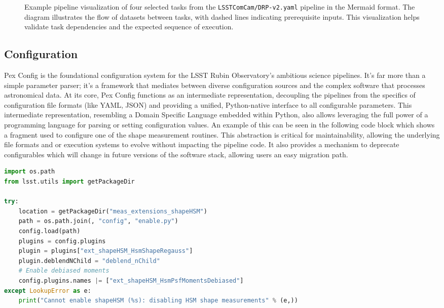 \begin{figure*}
    \centering
    \caption{
        Example pipeline visualization of four selected tasks from the \texttt{LSSTComCam/DRP-v2.yaml} pipeline in the Mermaid format.
        The diagram illustrates the flow of datasets between tasks, with dashed lines indicating prerequisite inputs.
        This visualization helps validate task dependencies and the expected sequence of execution.
    }
    \label{fig:pipe_viz}
\end{figure*}

\subsection{Configuration}
Pex Config is the foundational configuration system for the LSST Rubin Observatory's ambitious science pipelines.
It's far more than a simple parameter parser; it's a framework that mediates between diverse configuration sources and the complex software that processes astronomical data.
At its core, Pex Config functions as an intermediate representation, decoupling the pipelines from the specifics of configuration file formats (like YAML, JSON) and providing a unified, Python-native interface to all configurable parameters.
This intermediate representation, resembling a Domain Specific Language embedded within Python, also allows leveraging the full power of a programming language for parsing or setting configuration values.
An example of this can be seen in the following code block which shows a fragment used to configure one of the shape measurement routines.
This abstraction is critical for maintainability, allowing the underlying file formats and or execution systems to evolve without impacting the pipeline code.
It also provides a mechanism to deprecate configurables which will change in future versions of the software stack, allowing users an easy migration path.

\begin{minipage}{\columnwidth}
    \begin{lstlisting}[caption=Code configuration in python, language=python]
import os.path
from lsst.utils import getPackageDir

try:
    location = getPackageDir("meas_extensions_shapeHSM")
    path = os.path.join(, "config", "enable.py")
    config.load(path)
    plugins = config.plugins
    plugin = plugins["ext_shapeHSM_HsmShapeRegauss"]
    plugin.deblendNChild = "deblend_nChild"
    # Enable debiased moments
    config.plugins.names |= ["ext_shapeHSM_HsmPsfMomentsDebiased"]
except LookupError as e:
    print("Cannot enable shapeHSM (%s): disabling HSM shape measurements" % (e,))
    \end{lstlisting}
\end{minipage}


